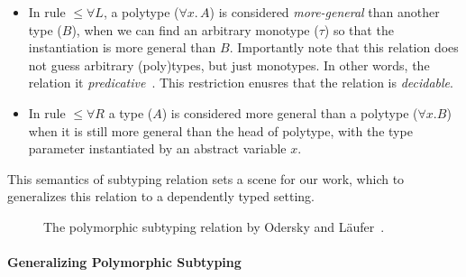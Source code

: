 \begin{itemize}
  \item In rule $\le\forall L$, a polytype ($\forall x.\, A$) is considered \emph{more-general}
        than another type ($B$), when we can find an arbitrary monotype ($\tau$)
        so that the instantiation is more general than $B$.
        Importantly note that this relation does not guess arbitrary (poly)types,
        but just monotypes. In other words, the relation it \emph{predicative}~\cite{}.
        This restriction enusres that the relation is \emph{decidable}. 
  \item In rule  $\le\forall R$ a type ($A$) is considered more general than a polytype ($\forall x. B$)
        when it is still more general than the head of polytype, with the type
        parameter instantiated by an abstract variable $x$.
\end{itemize}

This semantics of subtyping relation sets a scene for our work, which
to generalizes this relation to a dependently typed setting.

\begin{figure}
\centering


\caption{The polymorphic subtyping relation by Odersky and L\"aufer~\cite{odersky1996putting}.}
\label{fig:polymorphic-subtyping}
\end{figure}


\paragraph{Generalizing Polymorphic Subtyping}
\label{sec:polymorphic-subtyping}

